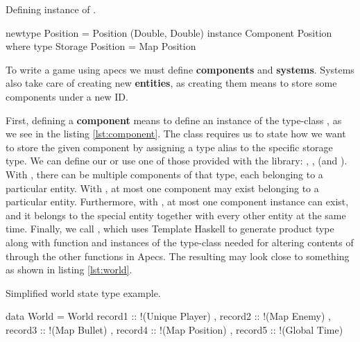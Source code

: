 \documentclass[
  digital, %
  color,   %
  table,   %
  oneside, %
  lof,     %
  lot,     %
]{fithesis3}
\begin{document}
\begin{listing}[H]
\caption{Defining instance of .}
\begin{haskell}
newtype Position = Position (Double, Double)
instance Component Position where
    type Storage Position = Map Position
\end{haskell}
\label{lst:component}
\end{listing}


To write a game using apecs we must define \textbf{components} and \textbf{systems}.
Systems also take care of creating new \textbf{entities},
as creating them means to store some components under a new ID.

First, defining a \textbf{component} means to define an instance of the type-class
, as we see in the listing \ref{lst:component}.
The  class
requires us to state how we want to store the given component
by assigning a type alias to the specific storage type.
We can define our  or use one of those provided
with the library: , ,  (and ).
With , there can be multiple components of that type,
each belonging to a particular entity.
With , at most one component may exist
belonging to a particular entity. Furthermore,
with , at most one component instance can exist,
and it belongs to the special  entity together
with every other entity at the same time. Finally, we call ,
which uses Template Haskell to generate  product type
along with  function and instances of the 
type-class needed for altering contents of  through
the other functions in Apecs. The resulting 
may look close to something as shown in listing \ref{lst:world}.

\begin{listing}[H]
\caption{Simplified world state type example.}
\begin{haskell}
data World =
    World
    { record1 :: !(Unique Player)
    , record2 :: !(Map Enemy)
    , record3 :: !(Map Bullet)
    , record4 :: !(Map Position)
    , record5 :: !(Global Time)
    }
\end{haskell}
\label{lst:world}
\end{listing}
\end{document}
